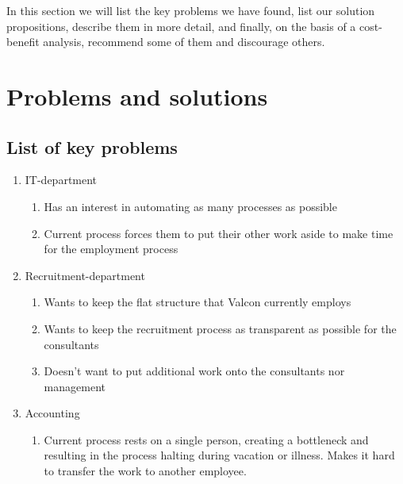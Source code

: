 In this section we will list the key problems we have found, list our solution propositions, describe them in more detail, and finally, on the basis of a cost-benefit analysis, recommend some of them and discourage others.

\section{Problems and solutions}
\subsection{List of key problems}
\begin{enumerate}
\item IT-department
	\begin{enumerate}
	\item Has an interest in automating as many processes as possible
	\item Current process forces them to put their other work aside to make time for the employment process
	\end{enumerate}
\item Recruitment-department
	\begin{enumerate}
	\item Wants to keep the flat structure that Valcon currently employs
	\item Wants to keep the recruitment process as transparent as possible for the consultants
	\item Doesn't want to put additional work onto the consultants nor management
	\end{enumerate}
\item Accounting
	\begin{enumerate}
	\item Current process rests on a single person, creating a bottleneck and resulting in the process halting during vacation or illness. Makes it hard to transfer the work to another employee.
	\end{enumerate}

\end{enumerate}

